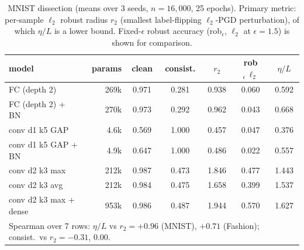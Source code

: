 \documentclass{article}
\theoremstyle{definition}
\begin{document}
\begin{table}[h]\centering
\caption{MNIST dissection (means over 3 seeds, $n{=}16{,}000$, 25 epochs). Primary metric: per-sample $\ell_2$ robust radius $r_2$ (smallest label-flipping $\ell_2$-PGD perturbation), of which $\eta/L$ is a lower bound. Fixed-$\epsilon$ robust accuracy (rob$_\epsilon$, $\ell_2$ at $\epsilon{=}1.5$) is shown for comparison.}
\label{tab:diss}
\footnotesize
\begin{tabular}{lrccccc}
\toprule
model & params & clean & consist. & $r_2$ & rob$_\epsilon\,\ell_2$ & $\eta/L$ \\
\midrule
FC (depth 2)            & 269k & 0.971 & 0.281 & 0.938 & 0.060 & 0.592 \\
FC (depth 2) + BN       & 270k & 0.973 & 0.292 & 0.962 & 0.043 & 0.668 \\
conv d1 k5 GAP          & 4.6k & 0.569 & 1.000 & 0.457 & 0.047 & 0.376 \\
conv d1 k5 GAP + BN     & 4.9k & 0.647 & 1.000 & 0.486 & 0.022 & 0.557 \\
conv d2 k3 max          & 212k & 0.987 & 0.473 & 1.846 & 0.477 & 1.443 \\
conv d2 k3 avg          & 212k & 0.984 & 0.475 & 1.658 & 0.399 & 1.537 \\
conv d2 k3 max + dense  & 953k & 0.986 & 0.487 & 1.944 & 0.570 & 1.627 \\
\midrule
\multicolumn{7}{l}{Spearman over 7 rows: $\eta/L$ vs $r_2 = +0.96$ (MNIST), $+0.71$ (Fashion); consist.\ vs $r_2 = -0.31$, $0.00$.}\\
\bottomrule
\end{tabular}
\end{table}
\end{document}
